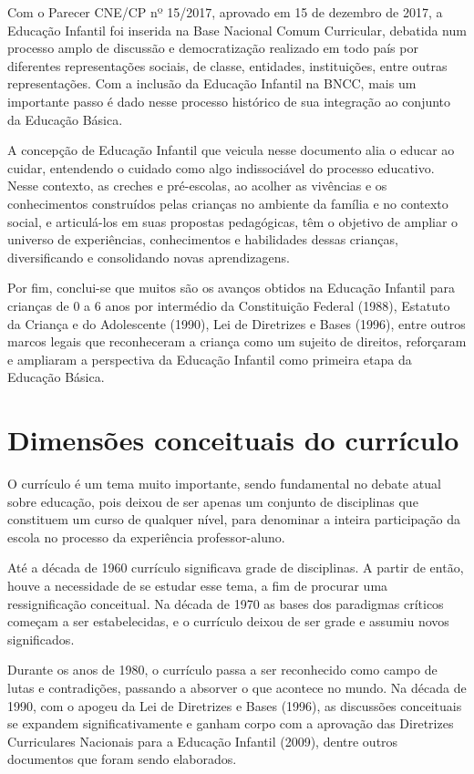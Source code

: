 \begin{refsection}
    Com o Parecer CNE/CP nº 15/2017, aprovado em 15 de dezembro de 2017, a Educação Infantil foi inserida na Base Nacional Comum Curricular, debatida num processo amplo de discussão e democratização realizado em todo país por diferentes representações sociais, de classe, entidades, instituições, entre outras representações. Com a inclusão da Educação Infantil na BNCC, mais um importante passo é dado nesse processo histórico de sua integração ao conjunto da Educação Básica. 

    A concepção de Educação Infantil que veicula nesse documento alia o educar ao cuidar, entendendo o cuidado como algo indissociável do processo educativo. Nesse contexto, as creches e pré-escolas, ao acolher as vivências e os conhecimentos construídos pelas crianças no ambiente da família e no contexto social, e articulá-los em suas propostas pedagógicas, têm o objetivo de ampliar o universo de experiências, conhecimentos e habilidades dessas crianças, diversificando e consolidando novas aprendizagens.  

    Por fim, conclui-se que muitos são os avanços obtidos na Educação Infantil para crianças de 0 a 6 anos por intermédio da Constituição Federal (1988), Estatuto da Criança e do Adolescente (1990), Lei de Diretrizes e Bases (1996), entre outros marcos legais que reconheceram a criança como um sujeito de direitos, reforçaram e ampliaram a perspectiva da Educação Infantil como primeira etapa da Educação Básica. 

    
    \section{Dimensões conceituais do currículo}

    O currículo é um tema muito importante, sendo fundamental no debate atual sobre educação, pois deixou de ser apenas um conjunto de disciplinas que constituem um curso de qualquer nível, para denominar a inteira participação da escola no processo da experiência professor-aluno.  

    Até a década de 1960 currículo significava grade de disciplinas. A partir de então, houve a necessidade de se estudar esse tema, a fim de procurar uma ressignificação conceitual. Na década de 1970 as bases dos paradigmas críticos começam a ser estabelecidas, e o currículo deixou de ser grade e assumiu novos significados. 

    Durante os anos de 1980, o currículo passa a ser reconhecido como campo de lutas e contradições, passando a absorver o que acontece no mundo. Na década de 1990, com o apogeu da Lei de Diretrizes e Bases (1996), as discussões conceituais se expandem significativamente e ganham corpo com a aprovação das Diretrizes Curriculares Nacionais para a Educação Infantil (2009), dentre outros documentos que foram sendo elaborados. 


\end{refsection}
